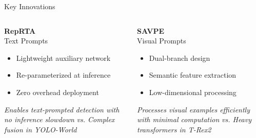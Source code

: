 \documentclass{beamer}
\begin{document}
\begin{frame}{Key Innovations}
    \begin{columns}[T]
        \begin{column}{0.32\textwidth}
            \centering
            \textbf{\textcolor{ubburgundy}{RepRTA}}\\
            \small{Text Prompts}
            \vspace{0.2cm}
            
            \begin{itemize}\footnotesize
                \item Lightweight auxiliary network
                \item Re-parameterized at inference
                \item Zero overhead deployment
            \end{itemize}
            
            \vspace{0.1cm}
            \footnotesize{\textit{Enables text-prompted detection with\\no inference slowdown}}
            \vspace{0.1cm}
            \footnotesize{\textit{vs. Complex fusion in YOLO-World}}
        \end{column}
        
        \begin{column}{0.32\textwidth}
            \centering
            \textbf{\textcolor{ubburgundy}{SAVPE}}\\
            \small{Visual Prompts}
            \vspace{0.2cm}
            
            \begin{itemize}\footnotesize
                \item Dual-branch design
                \item Semantic feature extraction
                \item Low-dimensional processing
            \end{itemize}
            
            \vspace{0.1cm}
            \footnotesize{\textit{Processes visual examples efficiently\\with minimal computation}}
            \vspace{0.1cm}
            \footnotesize{\textit{vs. Heavy transformers in T-Rex2}}
        \end{column}
        

\end{columns}
\end{frame}
\end{document}
